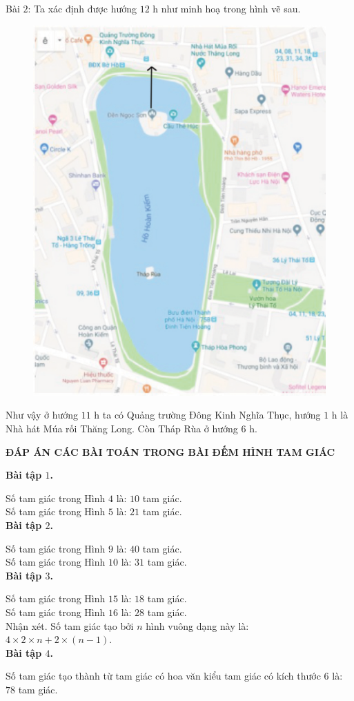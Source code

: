 Bài $2$: Ta xác định được hướng $12$ h như minh hoạ trong hình vẽ sau.
 \begin{figure}[H]
	\centering
	\vspace*{-5pt}
	\captionsetup{labelformat= empty, justification=centering}
	\includegraphics[width=0.5\linewidth]{bando.pdf}
	\vspace*{-15pt}
\end{figure}
 Như vậy ở hướng $11$ h ta có Quảng trường Đông Kinh Nghĩa Thục, hướng $1$ h là Nhà hát Múa rối Thăng Long. Còn Tháp Rùa ở hướng $6$ h.
\begin{center}
	\textbf{ĐÁP ÁN CÁC BÀI TOÁN TRONG BÀI ĐẾM HÌNH TAM GIÁC}
\end{center}
\textbf{Bài tập $1$.}

Số tam giác trong Hình $4$ là: $10$ tam giác.\\
Số tam giác trong Hình $5$ là: $21$ tam giác.\\
\textbf{Bài tập $2$.}

Số tam giác trong Hình $9$ là: $40$ tam giác.\\
Số tam giác trong Hình $10$ là: $31$ tam giác.\\
\textbf{Bài tập $3$.}

Số tam giác trong Hình $15$ là: $18$ tam giác.\\
Số tam giác trong Hình $16$ là: $28$ tam giác.\\
Nhận xét. Số tam giác tạo bởi $n$ hình vuông dạng này là: $4\times 2\times n + 2\times (n-1)$.\\

\textbf{Bài tập $4$.}

Số tam giác tạo thành từ tam giác có hoa văn kiểu tam giác có kích thước $6$ là: $78$ tam giác.

